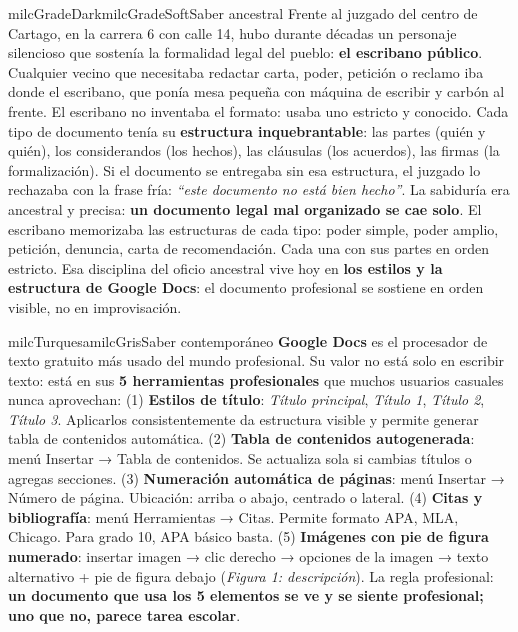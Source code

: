 \documentclass[11pt,letterpaper]{article}
\begin{document}
\begin{softbox}{milcGradeDark}{milcGradeSoft}{Saber ancestral}
Frente al juzgado del centro de Cartago, en la carrera 6 con calle 14, hubo durante décadas un personaje silencioso que sostenía la formalidad legal del pueblo: \textbf{el escribano público}. Cualquier vecino que necesitaba redactar carta, poder, petición o reclamo iba donde el escribano, que ponía mesa pequeña con máquina de escribir y carbón al frente. El escribano no inventaba el formato: usaba uno estricto y conocido. Cada tipo de documento tenía su \textbf{estructura inquebrantable}: las partes (quién y quién), los considerandos (los hechos), las cláusulas (los acuerdos), las firmas (la formalización). Si el documento se entregaba sin esa estructura, el juzgado lo rechazaba con la frase fría: \emph{``este documento no está bien hecho''}. La sabiduría era ancestral y precisa: \textbf{un documento legal mal organizado se cae solo}. El escribano memorizaba las estructuras de cada tipo: poder simple, poder amplio, petición, denuncia, carta de recomendación. Cada una con sus partes en orden estricto. Esa disciplina del oficio ancestral vive hoy en \textbf{los estilos y la estructura de Google Docs}: el documento profesional se sostiene en orden visible, no en improvisación.
\end{softbox}

\begin{softbox}{milcTurquesa}{milcGris}{Saber contemporáneo}
\textbf{Google Docs} es el procesador de texto gratuito más usado del mundo profesional. Su valor no está solo en escribir texto: está en sus \textbf{5 herramientas profesionales} que muchos usuarios casuales nunca aprovechan: (1) \textbf{Estilos de título}: \emph{Título principal}, \emph{Título 1}, \emph{Título 2}, \emph{Título 3}. Aplicarlos consistentemente da estructura visible y permite generar tabla de contenidos automática. (2) \textbf{Tabla de contenidos autogenerada}: menú Insertar → Tabla de contenidos. Se actualiza sola si cambias títulos o agregas secciones. (3) \textbf{Numeración automática de páginas}: menú Insertar → Número de página. Ubicación: arriba o abajo, centrado o lateral. (4) \textbf{Citas y bibliografía}: menú Herramientas → Citas. Permite formato APA, MLA, Chicago. Para grado 10, APA básico basta. (5) \textbf{Imágenes con pie de figura numerado}: insertar imagen → clic derecho → opciones de la imagen → texto alternativo + pie de figura debajo (\emph{Figura 1: descripción}). La regla profesional: \textbf{un documento que usa los 5 elementos se ve y se siente profesional; uno que no, parece tarea escolar}.
\end{softbox}
\end{document}
